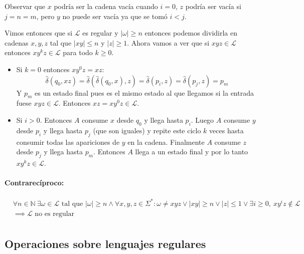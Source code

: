 \begin{demoPart}[0.8\textwidth]

  Observar que \(x\) podría ser la cadena vacía cuando \(i = 0\), \(z\) podría ser vacía si \(j = n = m\), pero \(y\) no puede ser vacía ya que se tomó \(i < j\).

  Vimos entonces que si \(\mathcal{L}\) es regular y \(|\omega| \geq n\) entonces podemos dividirla en cadenas \(x,y,z\) tal que \(|xy|\leq n\) y \(|z|\geq 1\). Ahora vamos a ver que si \(xyz \in \mathcal{L}\) entonces \(xy^kz \in \mathcal{L}\) para todo \(k\geq 0\).

  \begin{itemize}
    \item Si \(k = 0\) entonces \(xy^0z = xz\):
          \[\hat\delta(q_0, xz) = \hat\delta(\hat\delta(q_0, x), z) = \hat\delta(p_i, z) = \hat\delta(p_j, z) = p_m\]
          Y \(p_m\) es un estado final pues es el mismo estado al que llegamos si la entrada fuese \(xyz\in\mathcal{L}\). Entonces \(xz = xy^0z \in \mathcal{L}\).
    \item Si \(i > 0\). Entonces \(A\) consume \(x\) desde \(q_0\) y llega hasta \(p_i\). Luego \(A\) consume \(y\) desde \(p_i\) y llega hasta \(p_j\) (que son iguales) y repite este ciclo \(k\) veces hasta consumir todas las apariciones de \(y\) en la cadena. Finalmente \(A\) consume \(z\) desde \(p_j\) y llega hasta \(p_m\). Entonces \(A\) llega a un estado final y por lo tanto \(xy^kz \in \mathcal{L}\).
  \end{itemize}
\end{demoPart}
\paragraph{Contrarecíproco:}
\begin{align*}
   & \forall   n\in\mathbb{N}~\exists\omega\in\mathcal{L}\text{ tal que } |\omega|\geq n \land  \forall x,y,z\in\Sigma^*: \omega\neq xyz \lor|xy|\geq n\lor|z|\leq 1 \lor \exists i\geq 0,~ xy^iz\notin\mathcal{L} \\ &
  \implies \mathcal{L}\text{  no es regular}                                                                                                                                                                       \\
\end{align*}

\subsection{Operaciones sobre lenguajes regulares}
